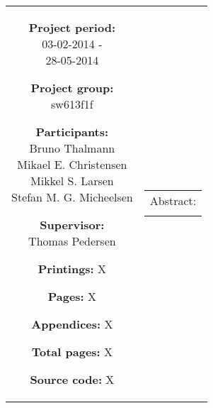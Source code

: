 \begin{titlepage}
\begin{nopagebreak}
{\begin{tabular}{cc}
{	\parbox{8cm}{
	\begin{description}
		\item { \textbf{Project period:}}\\
			03-02-2014 -\\
			28-05-2014
 		\hspace{4cm}
		\item { \textbf{Project group:}}\\
  			sw613f1f
 		\hspace{4cm}
		\item {\textbf{Participants:}}\\
			Bruno Thalmann\\
			Mikael E. Christensen\\
			Mikkel S. Larsen\\
			Stefan M. G. Micheelsen\\
		\hspace{2cm}
		\item { \textbf{Supervisor:}}\\
 			Thomas Pedersen\\
  	\end{description}
	}
	\begin{description}
		\item { \textbf{Printings:} X}
		\item { \textbf{Pages:} X } 
		\item { \textbf{Appendices:} X}
		\item { \textbf{Total pages:} X }
		\item { \textbf{Source code:} X}
	\end{description}
	\vfill } &
	\parbox{6.5cm}{
 	 \vspace{.15cm}
  	\hfill 
  	\begin{tabular}{l}
  		{ Abstract:}\bigskip \\
  		\fbox{
  		\parbox{6cm}{\bigskip
     		{\vfill{\small 
     		\bigskip}}
     	}}
   	\end{tabular}}
\end{tabular}
}%
\\
\vfill
{}
\end{nopagebreak}
\end{titlepage}
